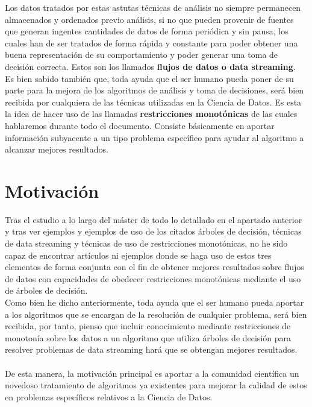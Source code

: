 Los datos tratados por estas astutas técnicas de análisis no siempre permanecen almacenados y ordenados previo análisis, si no que pueden provenir de fuentes que generan ingentes cantidades de datos de forma periódica y sin pausa, los cuales han de ser tratados de forma rápida y constante para poder obtener una buena representación de su comportamiento y poder generar una toma de decisión correcta. Estos son los llamados \textbf{flujos de datos o data streaming}.\\

Es bien sabido también que, toda ayuda que el ser humano pueda poner de su parte para la mejora de los algoritmos de análisis y toma de decisiones, será bien recibida por cualquiera de las técnicas utilizadas en la Ciencia de Datos. Es esta la idea de hacer uso de las llamadas \textbf{restricciones monotónicas} de las cuales hablaremos durante todo el documento. Consiste básicamente en aportar información subyacente a un tipo problema específico para ayudar al algoritmo a alcanzar mejores resultados.

\section{Motivación}

Tras el estudio a lo largo del máster de todo lo detallado en el apartado anterior y tras ver ejemplos y ejemplos de uso de los citados árboles de decisión, técnicas de data streaming y técnicas de uso de restricciones monotónicas, no he sido capaz de encontrar artículos ni ejemplos donde se haga uso de estos tres elementos de forma conjunta con el fin de obtener mejores resultados sobre flujos de datos con capacidades de obedecer restricciones monotónicas mediante el uso de árboles de decisión.\\

Como bien he dicho anteriormente, toda ayuda que el ser humano pueda aportar a los algoritmos que se encargan de la resolución de cualquier problema, será bien recibida, por tanto, pienso que incluir conocimiento mediante restricciones de monotonía sobre los datos a un algoritmo que utiliza árboles de decisión para resolver problemas de data streaming hará que se obtengan mejores resultados.\\\\

De esta manera, la motivación principal es aportar a la comunidad científica un novedoso tratamiento de algoritmos ya existentes para mejorar la calidad de estos en problemas específicos relativos a la Ciencia de Datos.

